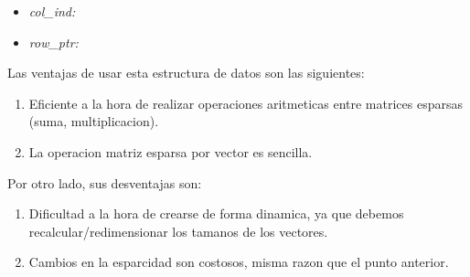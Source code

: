 \begin{center}
\begin{itemize}
  \item \textit{col_ind:}
\end{itemize}
\end{center}

\begin{center}
\begin{itemize}
  \item \textit{row_ptr:}
\end{itemize}

\end{center}

Las ventajas de usar esta estructura de datos son las siguientes:
\begin{enumerate}
  \item Eficiente a la hora de realizar operaciones aritmeticas entre matrices esparsas (suma, multiplicacion).
  \item La operacion matriz esparsa por vector es sencilla.
\end{enumerate}
Por otro lado, sus desventajas son:
\begin{enumerate}
  \item Dificultad a la hora de crearse de forma dinamica, ya que debemos recalcular/redimensionar los tamanos de los vectores.
  \item Cambios en la esparcidad son costosos, misma razon que el punto anterior.
\end{enumerate}

